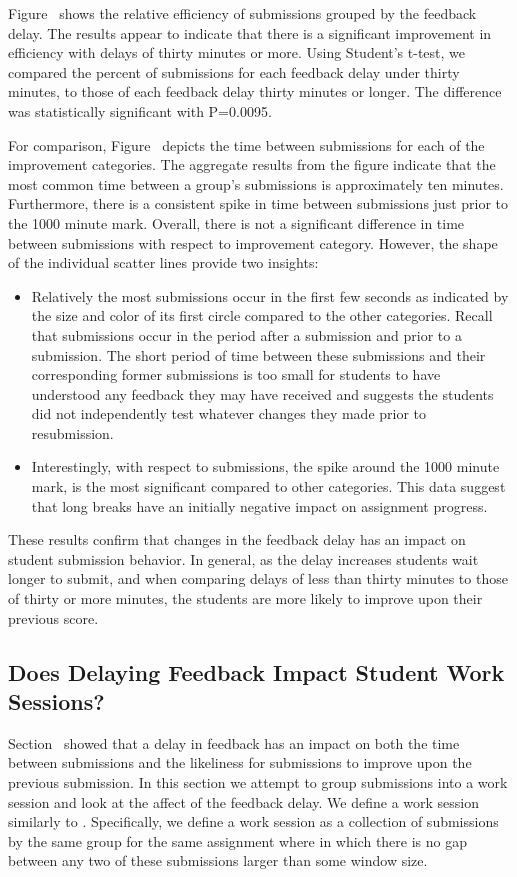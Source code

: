 Figure~ shows the relative efficiency of
submissions grouped by the feedback delay. The results appear to indicate that
there is a significant improvement in efficiency with delays of thirty minutes
or more. Using Student's t-test, we compared the percent of \imp{} submissions
for each feedback delay under thirty minutes, to those of each feedback delay
thirty minutes or longer. The difference was statistically significant with
P=0.0095.

For comparison, Figure~ depicts the time between
submissions for each of the improvement categories. The aggregate results from
the figure indicate that the most common time between a group's submissions is
approximately ten minutes. Furthermore, there is a consistent spike in time
between submissions just prior to the 1000 minute mark. Overall, there is not a
significant difference in time between submissions with respect to improvement
category. However, the shape of the individual scatter lines provide two
insights:

\begin{itemize}
\item Relatively the most \noii{} submissions occur in the first few seconds as
  indicated by the size and color of its first circle compared to the other
  categories. Recall that \noii{} submissions occur in the period after a
  \worse{} submission and prior to a \imp{} submission. The short period of
  time between these submissions and their corresponding former submissions is
  too small for students to have understood any feedback they may have received
  and suggests the students did not independently test whatever changes they
  made prior to resubmission.
\item Interestingly, with respect to \worse{} submissions, the spike around the
  1000 minute mark, is the most significant compared to other categories. This
  data suggest that long breaks have an initially negative impact on assignment
  progress.
\end{itemize}

These results confirm that changes in the feedback delay has an impact on
student submission behavior. In general, as the delay increases students wait
longer to submit, and when comparing delays of less than thirty minutes to
those of thirty or more minutes, the students are more likely to improve upon
their previous score.

\subsection{Does Delaying Feedback Impact Student Work Sessions?}
 Section~ showed that a delay
in feedback has an impact on both the time between submissions and the
likeliness for submissions to improve upon the previous submission. In this
section we attempt to group submissions into a work session and look at the
affect of the feedback delay. We define a work session similarly to
\spacco{}. Specifically, we define a work session as a collection of
submissions by the same group for the same assignment where in which there is
no gap between any two of these submissions larger than some window size.


